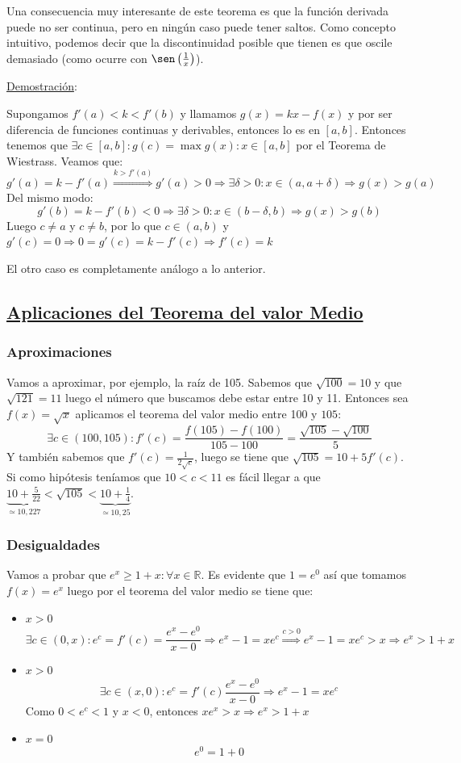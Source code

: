 \documentclass[10pt,a4paper,openright]{book}
\begin{document}
Una consecuencia muy interesante de este teorema es que la función derivada puede no ser continua, pero en ningún caso puede tener saltos. Como concepto intuitivo, podemos decir que la discontinuidad posible que tienen es que oscile demasiado (como ocurre con $\sen\left(\frac{1}{x}\right)$).

\underline{Demostración}:

Supongamos $f'(a)<k<f'(b)$ y llamamos $g(x)=kx-f(x)$ y por ser diferencia de funciones continuas y derivables, entonces lo es en $[a,b]$. Entonces tenemos que $\exists c \in [a,b]: g(c)=\max{g(x)}: x\in [a,b]$ por el Teorema de Wiestrass. Veamos que:
$$g'(a)=k-f'(a)\stackrel{k>f'(a)}{\Rightarrow}g'(a)>0\Rightarrow \exists \delta>0: x\in (a, a+\delta)\Rightarrow g(x)>g(a)$$
Del mismo modo:
$$g'(b)=k-f'(b)<0\Rightarrow\exists \delta>0 : x\in (b-\delta, b)\Rightarrow g(x)>g(b)$$
Luego $c\neq a$ y $c\neq b$, por lo que $c\in (a,b)$ y $g'(c)=0\Rightarrow 0=g'(c)=k-f'(c)\Rightarrow f'(c)=k$

El otro caso es completamente análogo a lo anterior.

\subsection*{\underline{Aplicaciones del Teorema del valor Medio}}
\subsubsection*{Aproximaciones}
Vamos a aproximar, por ejemplo, la raíz de 105. Sabemos que $\sqrt{100}=10$ y que $\sqrt{121}=11$ luego el número que buscamos debe estar entre 10 y 11. Entonces sea $f(x)=\sqrt{x}$ aplicamos el teorema del valor medio entre 100 y $105$:
$$\exists c\in (100, 105):f'(c)=\frac{f(105)-f(100)}{105-100}=\frac{\sqrt{105}-\sqrt{100}}{5}$$
Y también sabemos que $f'(c)=\frac{1}{2\sqrt{c}}$, luego se tiene que $\sqrt{105}=10+5f'(c)$. Si como hipótesis teníamos que $10<c<11$ es fácil llegar a que $\underbrace{10+\frac{5}{22}}_{\simeq 10,227}< \sqrt{105} < \underbrace{10+\frac{1}{4}}_{\simeq 10,25}$.

\subsubsection*{Desigualdades}
Vamos a probar que $e^x \geq 1+x:\forall x \in \mathbb R$. Es evidente que $1=e^0$ así que tomamos $f(x)=e^x$ luego por el teorema del valor medio se tiene que:
\begin{itemize}
\item $x>0$
$$\exists c\in (0,x): e^c=f'(c)=\frac{e^x-e^0}{x-0}\Rightarrow e^x-1=xe^c\stackrel{c>0}{\Rightarrow} e^x-1=xe^c>x\Rightarrow e^x>1+x$$

\item $x>0$
$$\exists c\in (x,0): e^c=f'(c)\frac{e^x-e^0}{x-0}\Rightarrow e^x-1=xe^c$$
Como $0<e^c<1$ y $x<0$, entonces $xe^x>x\Rightarrow e^x>1+x$

\item $x=0$
$$e^0=1+0$$
\end{itemize}
\end{document}
